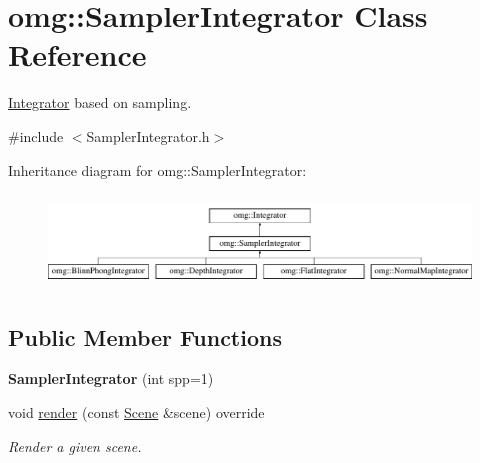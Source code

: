 \hypertarget{classomg_1_1_sampler_integrator}{}\section{omg\+::Sampler\+Integrator Class Reference}
\label{classomg_1_1_sampler_integrator}


\mbox{\hyperlink{classomg_1_1_integrator}{Integrator}} based on sampling.  




{\ttfamily \#include $<$Sampler\+Integrator.\+h$>$}

Inheritance diagram for omg\+::Sampler\+Integrator\+:\begin{figure}[H]
\begin{center}
\leavevmode
\includegraphics[height=2.500000cm]{classomg_1_1_sampler_integrator}
\end{center}
\end{figure}
\subsection*{Public Member Functions}
\begin{DoxyCompactItemize}
\item 
\mbox{\label{classomg_1_1_sampler_integrator_a3ee9f6dfcbddfb06ba3888d52cfeefe1}} 
{\bfseries Sampler\+Integrator} (int spp=1)
\item 
void \mbox{\hyperlink{classomg_1_1_sampler_integrator_a4b147659d3227e8dd8a38e7518ab5d72}{render}} (const \mbox{\hyperlink{classomg_1_1_scene}{Scene}} \&scene) override
\begin{DoxyCompactList}\small\item\em Render a given scene. \end{DoxyCompactList}\end{DoxyCompactItemize}
